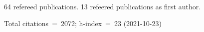 64 refereed publications. 13 refeered publications as first author.

Total citations~=~2072; h-index~=~23 (2021-10-23)